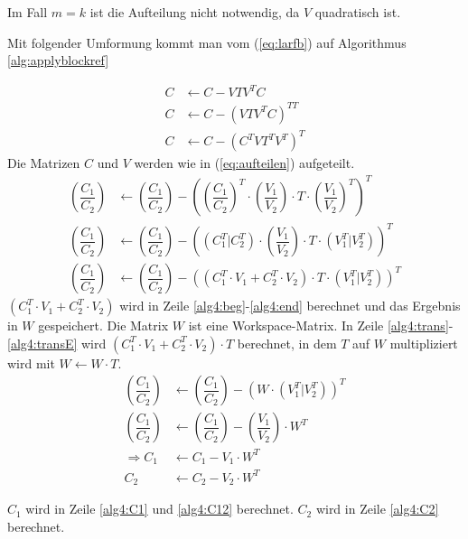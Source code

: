 Im Fall $ m = k $ ist die Aufteilung nicht notwendig, da $ V $ quadratisch ist.

Mit folgender Umformung kommt man vom (\ref{eq:larfb}) auf Algorithmus \ref{alg:applyblockref}

\begin{align*}
	C &\leftarrow  C - V T V^T C \\
	C &\leftarrow C - \left(V T V^T C\right)^{TT} 	\\
	C &\leftarrow  C - \left(C^T  V  T^T  V^T\right)^T
\end{align*}
Die Matrizen $C$ und $V$ werden wie in (\ref{eq:aufteilen}) aufgeteilt.
\begin{align*}
	\left(\dfrac{C_1}{C_2}\right) &\leftarrow  \left(\dfrac{C_1}{C_2}\right) -  \left( \left(\dfrac{C_1}{C_2}\right)^T \cdot \left(\dfrac{V_1}{V_2}\right) \cdot T \cdot \left(\dfrac{V_1}{V_2}\right)^T \right)^T \\
	\left(\dfrac{C_1}{C_2}\right) &\leftarrow  \left(\dfrac{C_1}{C_2}\right) - \left( \left(C_1^T|C_2^T\right)	\cdot \left(\dfrac{V_1}{V_2}\right) \cdot T \cdot \left(V_1^T|V_2^T\right) \right)^T \\
	\left(\dfrac{C_1}{C_2}\right) &\leftarrow  \left(\dfrac{C_1}{C_2}\right) - \left( \left( C_1^T \cdot V_1 + C_2^T \cdot V_2 \right) \cdot T \cdot \left(V_1^T|V_2^T\right) \right)^T 
\end{align*}
$ \left( C_1^T \cdot V_1 + C_2^T \cdot V_2 \right) $ wird in Zeile \ref{alg4:beg}-\ref{alg4:end} berechnet und das Ergebnis in $W$ gespeichert. Die Matrix $W$ ist eine Workspace-Matrix. In Zeile \ref{alg4:trans}-\ref{alg4:transE} wird  $ \left( C_1^T \cdot V_1 + C_2^T \cdot V_2 \right) \cdot T$ berechnet, in dem $T$ auf $W$ multipliziert wird mit $W \leftarrow W \cdot T$. 
\begin{align*}
	\left(\dfrac{C_1}{C_2}\right) &\leftarrow  \left(\dfrac{C_1}{C_2}\right) - \left( W \cdot \left(V_1^T|V_2^T\right) \right)^T \\
	\left(\dfrac{C_1}{C_2}\right) &\leftarrow  \left(\dfrac{C_1}{C_2}\right) - \left(\dfrac{V_1}{V_2}\right) \cdot W^T 	\\
	\Longrightarrow C_1 &\leftarrow C_1 - V_1 \cdot W^T\\
	C_2 &\leftarrow C_2 - V_2 \cdot W^T	
\end{align*}

$C_1$ wird in Zeile \ref{alg4:C1} und \ref{alg4:C12} berechnet. $C_2$ wird in Zeile \ref{alg4:C2} berechnet.



